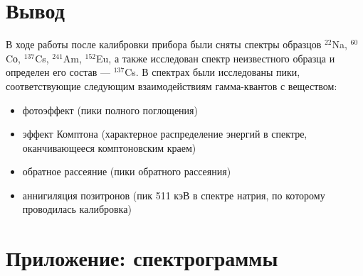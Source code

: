 \documentclass[a4paper]{article}
\begin{document}
\section{Вывод}

В ходе работы после калибровки прибора были сняты спектры образцов $^{22}$Na,  $^{60}$Cо,  $^{137}$Cs, $^{241}$Am, $^{152}$Eu, а также исследован спектр неизвестного образца и определен его состав --- $^{137}$Cs. В спектрах были исследованы пики, соответствующие следующим взаимодействиям гамма-квантов с веществом:
\begin{itemize}
    \item фотоэффект (пики полного поглощения)
    \item эффект Комптона (характерное распределение энергий в спектре, оканчивающееся комптоновским краем)
    \item обратное рассеяние (пики обратного рассеяния)
    \item аннигиляция позитронов (пик 511 кэВ в спектре натрия, по которому проводилась калибровка)
\end{itemize}


\section{Приложение: спектрограммы}
\end{document}
